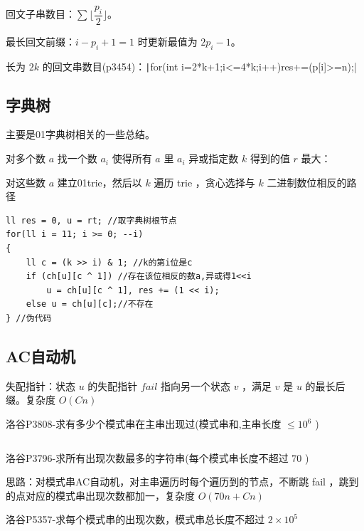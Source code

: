 \documentclass[twocolumn,10pt]{ctexart}
\begin{document}
回文子串数目：$\sum\lfloor\dfrac{p_i}2\rfloor$。

最长回文前缀：$i-p_i+1=1$ 时更新最值为 $2p_i-1$。

长为 $2k$ 的回文串数目(p3454)：\texttt|for(int i=2*k+1;i<=4*k;i++)res+=(p[i]>=n);|

\subsection{字典树}

\begin{notebox}
主要是01字典树相关的一些总结。
\end{notebox}

对多个数 $a$ 找一个数 $a_i$ 使得所有 $a$ 里 $a_i$ 异或指定数 $k$ 得到的值 $r$ 最大：

对这些数 $a$ 建立01trie，然后以 $k$ 遍历 trie ，贪心选择与 $k$ 二进制数位相反的路径

\begin{verbatim}
ll res = 0, u = rt; //取字典树根节点
for(ll i = 11; i >= 0; --i)
{
    ll c = (k >> i) & 1; //k的第i位是c
    if (ch[u][c ^ 1]) //存在该位相反的数a,异或得1<<i
        u = ch[u][c ^ 1], res += (1 << i);
    else u = ch[u][c];//不存在
} //伪代码
\end{verbatim}

\subsection{AC自动机}

失配指针：状态 $u$ 的失配指针 $fail$ 指向另一个状态 $v$ ，满足 $v$ 是 $u$ 的最长后缀。复杂度 $O(Cn)$

\begin{notebox}
洛谷P3808-求有多少个模式串在主串出现过(模式串和,主串长度 $\le10^6$ )
\end{notebox}

\inputminted{cpp}{code/p3808_ac_automaton.cpp}

\begin{notebox}
洛谷P3796-求所有出现次数最多的字符串(每个模式串长度不超过 $70$ )
\end{notebox}

思路：对模式串AC自动机，对主串遍历时每个遍历到的节点，不断跳 fail ，跳到的点对应的模式串出现次数都加一，复杂度 $O(70n+Cn)$

\begin{notebox}
洛谷P5357-求每个模式串的出现次数，模式串总长度不超过 $2\times10^5$
\end{notebox}
\end{document}
